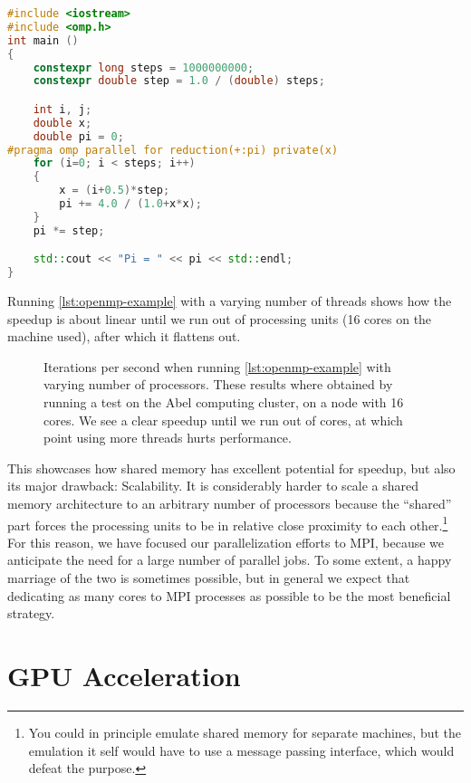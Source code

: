 \documentclass[Thesis.tex]{subfiles}
\begin{document}
\begin{center}
\begin{lstlisting}[language=C++, caption={Example of parallel estimation of
$\pi$ using OpenMP. The example is complete and can be compiled as is.}, label={lst:openmp-example}]
#include <iostream>
#include <omp.h>
int main ()
{
    constexpr long steps = 1000000000;
    constexpr double step = 1.0 / (double) steps;

    int i, j;
    double x;
    double pi = 0;
#pragma omp parallel for reduction(+:pi) private(x)
    for (i=0; i < steps; i++)
    {
        x = (i+0.5)*step;
        pi += 4.0 / (1.0+x*x);
    }
    pi *= step;

    std::cout << "Pi = " << pi << std::endl;
}
\end{lstlisting}
\end{center}
Running \cref{lst:openmp-example} with a varying number of threads shows how the
speedup is about linear until we run out of processing units (16 cores on the
machine used), after which it flattens out.

\begin{figure}[h]
  \centering
    \resizebox{0.7\linewidth}{!}{%
        
    }
  \caption{Iterations per second when running \cref{lst:openmp-example} with
    varying number of processors. These results where obtained by running a test
    on the Abel computing cluster, on a node with 16 cores. We see a clear
    speedup until we run out of cores, at which point using more threads hurts
    performance.}
  \label{fig:mpi-example}
\end{figure}

This showcases how shared memory has excellent potential for speedup, but also
its major drawback: Scalability. It is considerably harder to scale a shared
memory architecture to an arbitrary number of processors because the ``shared''
part forces the processing units to be in relative close proximity to each
other.\footnote{You could in principle emulate shared memory for separate
  machines, but the emulation it self would have to use a message passing
  interface, which would defeat the purpose.} For this reason, we have focused
our parallelization efforts to MPI, because we anticipate the need for a large
number of parallel jobs. To some extent, a happy marriage of the two is
sometimes possible, but in general we expect that dedicating as many cores to
MPI processes as possible to be the most beneficial strategy.


\section{GPU Acceleration}
\end{document}
